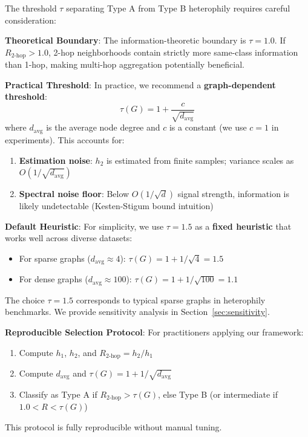\begin{remark}
\label{rem:threshold_tau}
The threshold $\tau$ separating Type A from Type B heterophily requires careful consideration:

\textbf{Theoretical Boundary}: The information-theoretic boundary is $\tau = 1.0$. If $R_{2\text{-hop}} > 1.0$, 2-hop neighborhoods contain strictly more same-class information than 1-hop, making multi-hop aggregation potentially beneficial.

\textbf{Practical Threshold}: In practice, we recommend a \textbf{graph-dependent threshold}:
\begin{equation}
    \tau(G) = 1 + \frac{c}{\sqrt{d_{\text{avg}}}}
\end{equation}
where $d_{\text{avg}}$ is the average node degree and $c$ is a constant (we use $c = 1$ in experiments). This accounts for:
\begin{enumerate}
    \item \textbf{Estimation noise}: $h_2$ is estimated from finite samples; variance scales as $O(1/\sqrt{d_{\text{avg}}})$
    \item \textbf{Spectral noise floor}: Below $O(1/\sqrt{d})$ signal strength, information is likely undetectable (Kesten-Stigum bound intuition)
\end{enumerate}

\textbf{Default Heuristic}: For simplicity, we use $\tau = 1.5$ as a \textbf{fixed heuristic} that works well across diverse datasets:
\begin{itemize}
    \item For sparse graphs ($d_{\text{avg}} \approx 4$): $\tau(G) = 1 + 1/\sqrt{4} = 1.5$
    \item For dense graphs ($d_{\text{avg}} \approx 100$): $\tau(G) = 1 + 1/\sqrt{100} = 1.1$
\end{itemize}
The choice $\tau = 1.5$ corresponds to typical sparse graphs in heterophily benchmarks. We provide sensitivity analysis in Section~\ref{sec:sensitivity}.

\textbf{Reproducible Selection Protocol}: For practitioners applying our framework:
\begin{enumerate}
    \item Compute $h_1$, $h_2$, and $R_{2\text{-hop}} = h_2/h_1$
    \item Compute $d_{\text{avg}}$ and $\tau(G) = 1 + 1/\sqrt{d_{\text{avg}}}$
    \item Classify as Type A if $R_{2\text{-hop}} > \tau(G)$, else Type B (or intermediate if $1.0 < R < \tau(G)$)
\end{enumerate}
This protocol is fully reproducible without manual tuning.
\end{remark}

